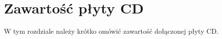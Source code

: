 \chapter{Zawartość płyty CD}
\thispagestyle{chapterBeginStyle}
\label{plytaCD}

W tym rozdziale należy krótko omówić zawartość dołączonej płyty CD.


